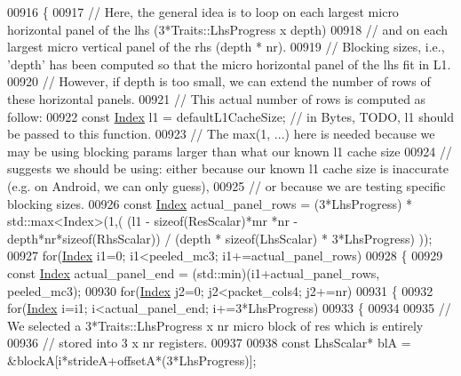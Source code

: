 \begin{DoxyCode}
00916     \{
00917       \textcolor{comment}{// Here, the general idea is to loop on each largest micro horizontal panel of the lhs
       (3*Traits::LhsProgress x depth)}
00918       \textcolor{comment}{// and on each largest micro vertical panel of the rhs (depth * nr).}
00919       \textcolor{comment}{// Blocking sizes, i.e., 'depth' has been computed so that the micro horizontal panel of the lhs fit
       in L1.}
00920       \textcolor{comment}{// However, if depth is too small, we can extend the number of rows of these horizontal panels.}
00921       \textcolor{comment}{// This actual number of rows is computed as follow:}
00922       \textcolor{keyword}{const} \hyperlink{namespace_eigen_a62e77e0933482dafde8fe197d9a2cfde}{Index} l1 = defaultL1CacheSize; \textcolor{comment}{// in Bytes, TODO, l1 should be passed to this function.}
00923       \textcolor{comment}{// The max(1, ...) here is needed because we may be using blocking params larger than what our known
       l1 cache size}
00924       \textcolor{comment}{// suggests we should be using: either because our known l1 cache size is inaccurate (e.g. on
       Android, we can only guess),}
00925       \textcolor{comment}{// or because we are testing specific blocking sizes.}
00926       \textcolor{keyword}{const} \hyperlink{namespace_eigen_a62e77e0933482dafde8fe197d9a2cfde}{Index} actual\_panel\_rows = (3*LhsProgress) * std::max<Index>(1,( (l1 - \textcolor{keyword}{sizeof}(ResScalar)*mr
      *nr - depth*nr*\textcolor{keyword}{sizeof}(RhsScalar)) / (depth * \textcolor{keyword}{sizeof}(LhsScalar) * 3*LhsProgress) ));
00927       \textcolor{keywordflow}{for}(\hyperlink{namespace_eigen_a62e77e0933482dafde8fe197d9a2cfde}{Index} i1=0; i1<peeled\_mc3; i1+=actual\_panel\_rows)
00928       \{
00929         \textcolor{keyword}{const} \hyperlink{namespace_eigen_a62e77e0933482dafde8fe197d9a2cfde}{Index} actual\_panel\_end = (std::min)(i1+actual\_panel\_rows, peeled\_mc3);
00930         \textcolor{keywordflow}{for}(\hyperlink{namespace_eigen_a62e77e0933482dafde8fe197d9a2cfde}{Index} j2=0; j2<packet\_cols4; j2+=nr)
00931         \{
00932           \textcolor{keywordflow}{for}(\hyperlink{namespace_eigen_a62e77e0933482dafde8fe197d9a2cfde}{Index} i=i1; i<actual\_panel\_end; i+=3*LhsProgress)
00933           \{
00934           
00935           \textcolor{comment}{// We selected a 3*Traits::LhsProgress x nr micro block of res which is entirely}
00936           \textcolor{comment}{// stored into 3 x nr registers.}
00937           
00938           \textcolor{keyword}{const} LhsScalar* blA = &blockA[i*strideA+offsetA*(3*LhsProgress)];

\end{DoxyCode}
